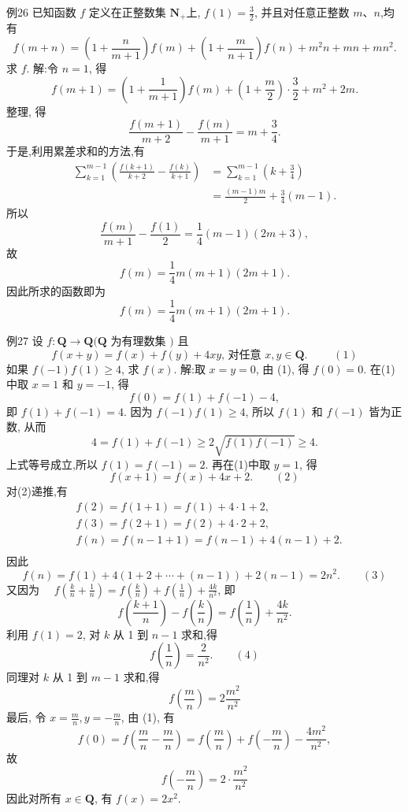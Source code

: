 例26 已知函数 $f$ 定义在正整数集 $\mathbf{N}_{+}$上, $f(1)=\frac{3}{2}$, 并且对任意正整数 $m 、 n$,均有
$$
f(m+n)=\left(1+\frac{n}{m+1}\right) f(m)+\left(1+\frac{m}{n+1}\right) f(n)+m^2 n+m n+m n^2 .
$$
求 $f$.
解:令 $n=1$, 得
$$
f(m+1)=\left(1+\frac{1}{m+1}\right) f(m)+\left(1+\frac{m}{2}\right) \cdot \frac{3}{2}+m^2+2 m .
$$
整理, 得
$$
\frac{f(m+1)}{m+2}-\frac{f(m)}{m+1}=m+\frac{3}{4} .
$$
于是,利用累差求和的方法,有
$$
\begin{aligned}
\sum_{k=1}^{m-1}\left(\frac{f(k+1)}{k+2}-\frac{f(k)}{k+1}\right) & =\sum_{k=1}^{m-1}\left(k+\frac{3}{4}\right) \\
& =\frac{(m-1) m}{2}+\frac{3}{4}(m-1) .
\end{aligned}
$$
所以
$$
\frac{f(m)}{m+1}-\frac{f(1)}{2}=\frac{1}{4}(m-1)(2 m+3),
$$
故
$$
f(m)=\frac{1}{4} m(m+1)(2 m+1) .
$$
因此所求的函数即为
$$
f(m)=\frac{1}{4} m(m+1)(2 m+1) .
$$



例27 设 $f: \mathbf{Q} \rightarrow \mathbf{Q}(\mathbf{Q}$ 为有理数集 $)$ 且
$$
f(x+y)=f(x)+f(y)+4 x y \text {, 对任意 } x, y \in \mathbf{Q} \text {. } \quad\quad (1)
$$
如果 $f(-1) f(1) \geqslant 4$, 求 $f(x)$.
解:取 $x=y=0$, 由 (1), 得 $f(0)=0$.
在(1)中取 $x=1$ 和 $y=-1$, 得
$$
f(0)=f(1)+f(-1)-4,
$$
即 $f(1)+f(-1)=4$.
因为 $f(-1) f(1) \geqslant 4$, 所以 $f(1)$ 和 $f(-1)$ 皆为正数, 从而
$$
4=f(1)+f(-1) \geqslant 2 \sqrt{f(1) f(-1)} \geqslant 4 .
$$
上式等号成立,所以 $f(1)=f(-1)=2$.
再在(1)中取 $y=1$, 得
$$
f(x+1)=f(x)+4 x+2 . \quad\quad (2)
$$
对(2)递推,有
$$
\begin{aligned}
& f(2)=f(1+1)=f(1)+4 \cdot 1+2, \\
& f(3)=f(2+1)=f(2)+4 \cdot 2+2 \text {, } \\
& f(n)=f(n-1+1)=f(n-1)+4(n-1)+2 . \\
&
\end{aligned}
$$
因此
$$
f(n)=f(1)+4(1+2+\cdots+(n-1))+2(n-1)=2 n^2 . \quad\quad (3)
$$
又因为 $\quad f\left(\frac{k}{n}+\frac{1}{n}\right)=f\left(\frac{k}{n}\right)+f\left(\frac{1}{n}\right)+\frac{4 k}{n^2}$,
即
$$
f\left(\frac{k+1}{n}\right)-f\left(\frac{k}{n}\right)=f\left(\frac{1}{n}\right)+\frac{4 k}{n^2} .
$$
利用 $f(1)=2$, 对 $k$ 从 1 到 $n-1$ 求和,得
$$
f\left(\frac{1}{n}\right)=\frac{2}{n^2}   . \quad\quad (4)
$$
同理对 $k$ 从 1 到 $m-1$ 求和,得
$$
f\left(\frac{m}{n}\right)=2 \frac{m^2}{n^2}
$$
最后, 令 $x=\frac{m}{n}, y=-\frac{m}{n}$, 由 (1), 有
$$
f(0)=f\left(\frac{m}{n}-\frac{m}{n}\right)=f\left(\frac{m}{n}\right)+f\left(-\frac{m}{n}\right)-\frac{4 m^2}{n^2},
$$
故
$$
f\left(-\frac{m}{n}\right)=2 \cdot \frac{m^2}{n^2}
$$
因此对所有 $x \in \mathbf{Q}$, 有 $f(x)=2 x^2$.



